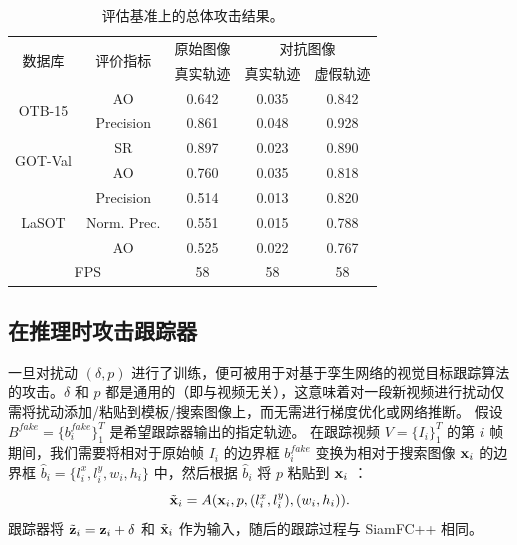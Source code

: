 \begin{table}[t]
\centering
\caption{评估基准上的总体攻击结果。}
\begin{tabular}{c c c c c}
\toprule
\multirow{2}{*}[-2pt]{数据库} & \multirow{2}{*}[-2pt]{评价指标} & 原始图像 & \multicolumn{2}{c}{对抗图像}  \\
\cmidrule(lr){3-3} \cmidrule(lr){4-5}
                          &                         & 真实轨迹 & 真实轨迹 & 虚假轨迹     \\ 
\midrule
\multirow{2}{*}{OTB-15} 
& AO   & 0.642 & 0.035 & 0.842\\
& Precision & 0.861 & 0.048 & 0.928\\
\midrule
\multirow{2}{*}{GOT-Val} 
& SR & 0.897 & 0.023 & 0.890\\
& AO 				   & 0.760 & 0.035 & 0.818 \\
\midrule
\multirow{3}{*}{LaSOT} 
& Precision       & 0.514 & 0.013 & 0.820\\
& Norm. Prec. & 0.551 & 0.015 & 0.788\\
& AO & 0.525 & 0.022 & 0.767\\
\midrule
\multicolumn{2}{c}{FPS} & 58 & 58 & 58\\
\bottomrule
\end{tabular}
\label{tab:attack_benchmark results}
\end{table}

\subsection{在推理时攻击跟踪器}

一旦对扰动 $(\delta, p)$ 进行了训练，便可被用于对基于孪生网络的视觉目标跟踪算法的攻击。$\delta$ 和 $p$ 都是通用的（即与视频无关），这意味着对一段新视频进行扰动仅需将扰动添加/粘贴到模板/搜索图像上，而无需进行梯度优化或网络推断。
假设 $B^{fake}=\{b^{fake}_i\}_1^{T}$ 是希望跟踪器输出的指定轨迹。
在跟踪视频 $V=\{I_i\}_1^T$ 的第 $i$ 帧期间，我们需要将相对于原始帧 $I_i$ 的边界框 $b^{fake}_i$ 变换为相对于搜索图像 $\textbf x_i$ 的边界框 $\hat b_i=\{l^x_i, l^y_i, w_i, h_i\}$ 中，然后根据 $\hat b_i$ 将 $p$ 粘贴到 $\textbf x_i$ ：
\begin{equation}
\tilde{\textbf x}_i = A(\textbf x_i, p, (l^x_i, l^y_i), (w_i, h_i)).
\end{equation}
跟踪器将 $\tilde{\textbf z}_i=\textbf z_i+\delta$ 和 $\tilde{\textbf x}_i$ 作为输入，随后的跟踪过程与 SiamFC++ 相同。

